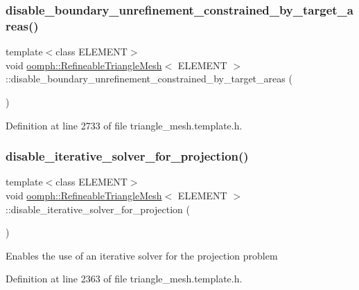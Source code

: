 \subsubsection{\texorpdfstring{disable\+\_\+boundary\+\_\+unrefinement\+\_\+constrained\+\_\+by\+\_\+target\+\_\+areas()}{disable\_boundary\_unrefinement\_constrained\_by\_target\_areas()}}
{\footnotesize\ttfamily template$<$class E\+L\+E\+M\+E\+NT$>$ \\
void \hyperlink{classoomph_1_1RefineableTriangleMesh}{oomph\+::\+Refineable\+Triangle\+Mesh}$<$ E\+L\+E\+M\+E\+NT $>$\+::disable\+\_\+boundary\+\_\+unrefinement\+\_\+constrained\+\_\+by\+\_\+target\+\_\+areas (\begin{DoxyParamCaption}{ }\end{DoxyParamCaption})\hspace{0.3cm}{\ttfamily [inline]}}



Definition at line 2733 of file triangle\+\_\+mesh.\+template.\+h.

\mbox{\label{classoomph_1_1RefineableTriangleMesh_a081ddf29176d5599c6af173f73dd4a8d}} 
\subsubsection{\texorpdfstring{disable\+\_\+iterative\+\_\+solver\+\_\+for\+\_\+projection()}{disable\_iterative\_solver\_for\_projection()}}
{\footnotesize\ttfamily template$<$class E\+L\+E\+M\+E\+NT$>$ \\
void \hyperlink{classoomph_1_1RefineableTriangleMesh}{oomph\+::\+Refineable\+Triangle\+Mesh}$<$ E\+L\+E\+M\+E\+NT $>$\+::disable\+\_\+iterative\+\_\+solver\+\_\+for\+\_\+projection (\begin{DoxyParamCaption}{ }\end{DoxyParamCaption})\hspace{0.3cm}{\ttfamily [inline]}}

Enables the use of an iterative solver for the projection problem 

Definition at line 2363 of file triangle\+\_\+mesh.\+template.\+h.

